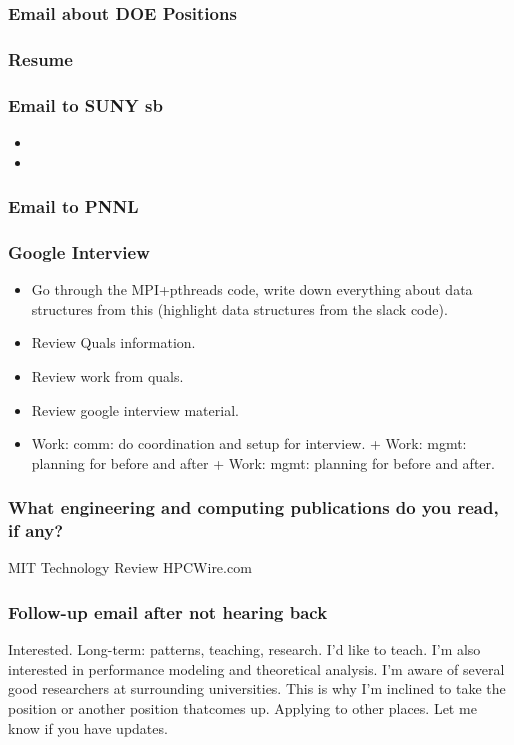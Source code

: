 \begin{frame}
\frametitle{Email about DOE Positions}
\end{frame} 

\begin{frame}
\frametitle{Resume}
\end{frame}

\begin{frame}
\frametitle{Email to SUNY sb} 
\begin{itemize} 
\tiny \item \tiny 
\item \tiny 
\end{itemize} 
\end{frame} 

\begin{frame} 
\frametitle{Email to PNNL }
\end{frame} 


\begin{frame}
\frametitle{Google Interview}
\begin{itemize} 
\tiny \item \tiny Go through the MPI+pthreads code, write down everything about
data structures from this (highlight data structures from the slack
code). 
\tiny \item \tiny Review Quals information. 
\item \tiny Review work from quals. 
\item \tiny Review google interview material. 
\item \tiny Work: comm: do coordination and setup for interview. +
  Work: mgmt: planning for before and after + Work: mgmt: planning for
  before and after. 
\end{itemize} 
\end{frame}


\begin{frame}[label=engPubs]
\frametitle{What engineering and computing publications do you read, if any?}
MIT Technology Review
HPCWire.com
\end{frame} 

\begin{frame} 
\frametitle{Follow-up email after not hearing back} 
 Interested.
 Long-term: patterns, teaching, research. I'd like to teach. 
          I'm also interested in performance modeling and theoretical
          analysis. I'm aware of several good researchers at
          surrounding universities. This is why I'm inclined to take
          the position or another position thatcomes up.
          Applying to other places.
          Let me know if you have updates.
\end{frame}


